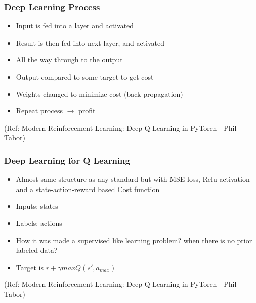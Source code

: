\begin{frame}[fragile]\frametitle{Deep Learning Process}


\begin{itemize}
\item Input is fed into a layer and activated 
\item Result is then fed into next layer, and activated 
\item All the way through to the output
\item Output compared to some target to get cost 
\item  Weights changed to minimize cost (back propagation)
\item Repeat process $\rightarrow$ profit
\end{itemize}

{\tiny (Ref: Modern Reinforcement Learning: Deep Q Learning in PyTorch - Phil Tabor)}

\end{frame}

\begin{frame}[fragile]\frametitle{Deep Learning for Q Learning}


\begin{itemize}
\item Almost same structure as any standard but with MSE loss, Relu activation and a state-action-reward based Cost function
\item Inputs: states
\item Labels: actions
\item How it was made a supervised like learning problem? when there is no prior labeled data?
\item Target is $r + \gamma max Q(s',a_{max})$
\end{itemize}

{\tiny (Ref: Modern Reinforcement Learning: Deep Q Learning in PyTorch - Phil Tabor)}

\end{frame}

